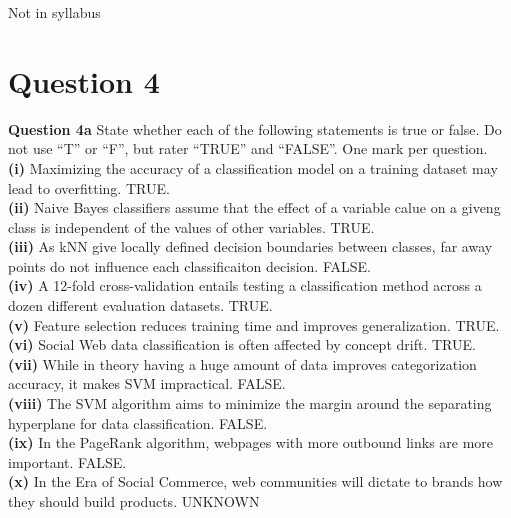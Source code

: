 \documentclass[11pt,a4paper]{report}
\begin{document}
\begin{multicols*}{2}
\noindent Not in syllabus

\section{Question 4}

\noindent \textbf{Question 4a} State whether each of the following statements is true or false. Do not use ``T'' or ``F'', but rater ``TRUE'' and ``FALSE''. One mark per question.\\

\noindent \textbf{(i)} Maximizing the accuracy of a classification model on a training dataset may lead to overfitting. TRUE.\\

\noindent \textbf{(ii)} Naive Bayes classifiers assume that the effect of a variable calue on a giveng class is independent of the values of other variables. TRUE.\\

\noindent \textbf{(iii)} As kNN give locally defined decision boundaries between classes, far away points do not influence each classificaiton decision. FALSE.\\

\noindent \textbf{(iv)} A 12-fold cross-validation entails testing a classification method across a dozen different evaluation datasets. TRUE.\\

\noindent \textbf{(v)} Feature selection reduces training time and improves generalization. TRUE.\\

\noindent \textbf{(vi)} Social Web data classification is often affected by concept drift. TRUE.\\

\noindent \textbf{(vii)} While in theory having a huge amount of data improves categorization accuracy, it makes SVM impractical. FALSE.\\

\noindent \textbf{(viii)} The SVM algorithm aims to minimize the margin around the separating hyperplane for data classification. FALSE.\\

\noindent \textbf{(ix)} In the PageRank algorithm, webpages with more outbound links are more important. FALSE.\\

\noindent \textbf{(x)} In the Era of Social Commerce, web communities will dictate to brands how they should build products. UNKNOWN\\


\end{multicols*}
\end{document}
